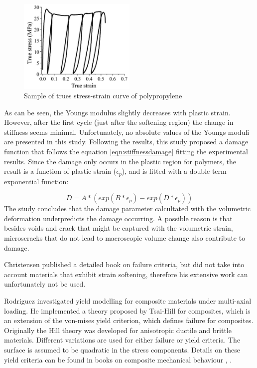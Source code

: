 \begin{figure}[htb]
    \centering
    \includegraphics[width=0.5\textwidth]{chapter_2/figures/damagepolymer.png}
    \caption{Sample of trues stress-strain curve of polypropylene\cite{Gu2013ExperimentalThermoplastics} }
    \label{fig:damagepolymer}
\end{figure}
As can be seen, the Youngs modulus slightly decreases with plastic strain. However, after the first cycle (just after the softening region) the change in stiffness seems minimal.  Unfortunately, no absolute values of the Youngs moduli are presented in this study. 
Following the results, this study proposed a damage function that follows the equation \ref{eqn:stiffnessdamage} fitting the experimental results. Since the damage only occurs in the plastic region for polymers, the result is a function of plastic strain ($\epsilon_p$), and is fitted with a double term exponential function:

\begin{equation}%
D=A*(exp(B*\epsilon_p)-exp(D*\epsilon_p))
\end{equation}The study concludes that the damage parameter calcultated with the volumetric deformation underpredicts the damage occurring. A possible reason is that besides voids and crack that might be captured with the volumetric strain, microscracks that do not lead to macroscopic volume change also contribute to damage. 

Christensen \cite{Christensen2013TheFailure}  published a detailed book on failure criteria, but did not take into account materials that exhibit strain softening, therefore his extensive work can unfortunately not be used. 

Rodriguez \cite{Rodriguez2003MechanicalModeling} investigated yield modelling for composite materials under multi-axial loading. He implemented a theory proposed by Tsai-Hill for composites, which is an extension of the von-mises yield criterion, which defines failure for composites. Originally the Hill theory was developed for anisotropic ductile and brittle materials. Different variations are used for either failure or yield criteria. The  surface is assumed to be quadratic in the stress components. Details on these yield criteria can be found in books on composite mechanical behaviour \cite{Daniel2006EngineeringMaterials}, \cite{Mallick2007Fiber-Composites}.

